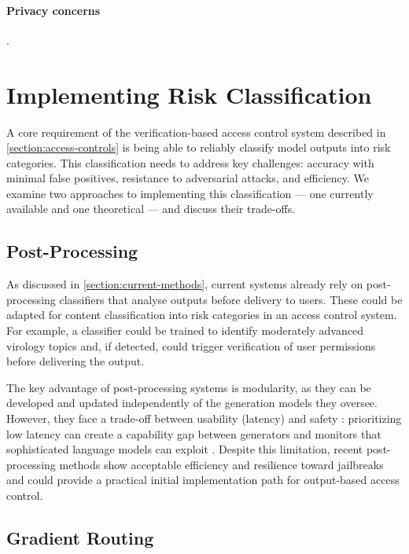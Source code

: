 \documentclass{article}
\theoremstyle{plain}
\theoremstyle{definition}
\theoremstyle{remark}
\begin{document}
\paragraph{Privacy concerns}.

\section{Implementing Risk Classification} \label{section:risk-classification}

A core requirement of the verification-based access control system
described in \cref{section:access-controls} is being able to reliably
classify model outputs into risk categories.
This classification needs to address key challenges: accuracy with
minimal false positives, resistance to adversarial attacks, and efficiency.
We examine two approaches to implementing this classification --- one
currently available and one theoretical --- and discuss their trade-offs.

\subsection{Post-Processing}

As discussed in \cref{section:current-methods}, current systems
already rely on post-processing classifiers that analyse outputs
before delivery to users.
These could be adapted for content classification into risk
categories in an access control system.
For example, a classifier could be trained to identify moderately
advanced virology topics and, if detected, could trigger verification
of user permissions before delivering the output.

The key advantage of post-processing systems is modularity, as they
can be developed and updated independently of the generation models
they oversee.
However, they face a trade-off between usability (latency) and safety
\cite{kumar2025freelunchguardrails}: prioritizing low latency can
create a capability gap between generators and monitors that
sophisticated language models can exploit
\cite{jin2024jailbreakinglargelanguagemodels}.
Despite this limitation, recent post-processing methods show
acceptable efficiency and resilience toward jailbreaks
\cite{sharma2025constitutionalclassifiersdefendinguniversal} and
could provide a practical initial implementation path for
output-based access control.

\subsection{Gradient Routing} \label{section:gradient-routing}
\end{document}
